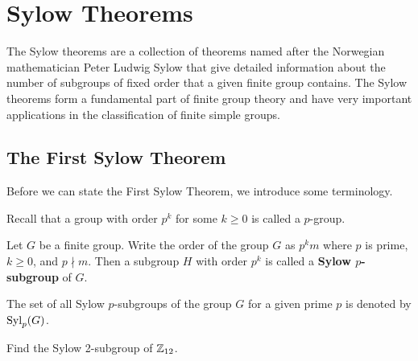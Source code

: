 \chapter{Sylow Theorems}
The Sylow theorems are a collection of theorems named after the Norwegian mathematician Peter Ludwig Sylow that give detailed information about the number of subgroups of fixed order that a given finite group contains. The Sylow theorems form a fundamental part of finite group theory and have very important applications in the classification of finite simple groups.

\section{The First Sylow Theorem}
Before we can state the First Sylow Theorem, we introduce some terminology.

Recall that a group with order $p^k$ for some $k \geq 0$ is called a $p$-group.

\begin{definition}\label{definition-sylow-p-subgroup}
    Let $G$ be a finite group. Write the order of the group $G$ as $p^k m$ where $p$ is prime, $k \geq 0$, and $p \nmid m$. Then a subgroup $H$ with order $p^k$ is called a \textbf{Sylow $p$-subgroup} of $G$.

    The set of all Sylow $p$-subgroups of the group $G$ for a given prime $p$ is denoted by $\mathrm{Syl}_{p}(G)$.
\end{definition}
\begin{exercise}
    Find the Sylow 2-subgroup of $\mathbb{Z}_{12}$.
\end{exercise}

